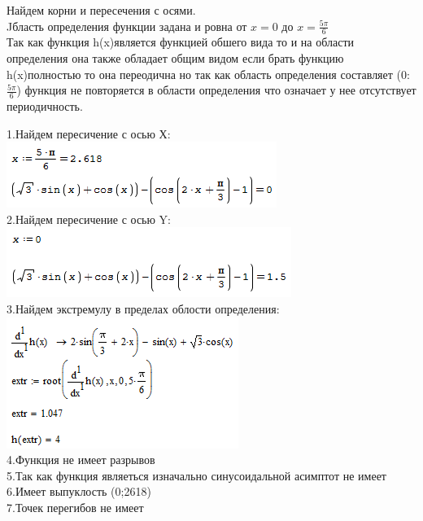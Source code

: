 \documentclass[russian,utf8,nocolumnxxxi,nocolumnxxxii]{eskdtext}
\begin{document}
{
\newpage
Найдем корни и пересечения с осями.
\\Jбласть определения функции задана и ровна от $x=0$ до $x=\frac{5\pi}{6}$
\\Так как функция h(x)является функцией обшего вида то и на области определения она также обладает общим видом если брать функцию h(x)полностью то она переодична  но так как область определения составляет (0:$\frac {5\pi}{6}$) функция не повторяется в области определения что означает у нее отсутствует периодичность.
\par
\normalsize
1.Найдем пересичение с осью Х:
\\\includegraphics[scale=0.90]{2019-01-11_02-56-05}
\\2.Найдем пересичение с осью Y:
\\\includegraphics[scale=0.90]{2019-01-11_02-56-50}
\\3.Найдем экстремулу в пределах облости определения:
\\\includegraphics[scale=1]{2019-01-11_03-18-55}
\\4.Функция не имеет разрывов 
\\5.Так как функция являеться изначально синусоидальной асимптот не имеет
\\6.Имеет выпуклость (0;2618) 
\\7.Точек перегибов не имеет

}
\end{document}
